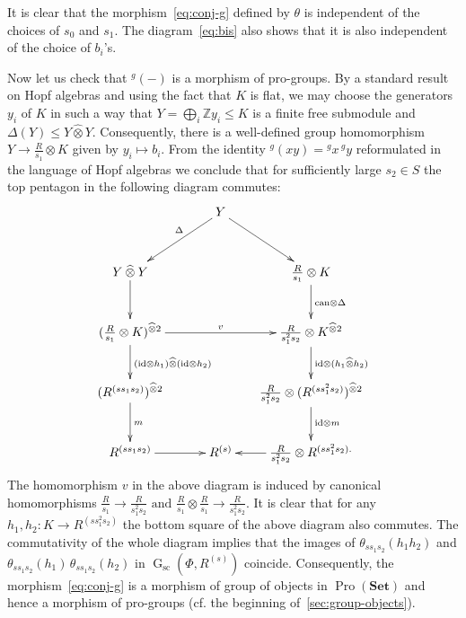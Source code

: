 \documentclass[oneside, 11pt]{amsart}
\numberwithin{equation}{section}
\theoremstyle{definition}
\theoremstyle{remark}
\DeclareMathOperator\GG{G}
\DeclareMathOperator{\Pro}{Pro}
\newcommand{\Set}{\mathbf{Set}}
\newcommand{\otimeshat}{\mathbin{\widehat{\otimes}}}
\newcommand{\up}[2]{{^{#1}\!{#2}}}
\begin{document}
It is clear that the morphism~\eqref{eq:conj-g} defined by $\theta$ is independent of the choices of $s_0$ and $s_1$. The diagram~\eqref{eq:bis} also shows that it is also independent of the choice of $b_i$'s.

Now let us check that \(\up g{(-)}\) is a morphism of pro-groups.
By a standard result on Hopf algebras and using the fact that $K$ is flat, we may choose the generators $y_i$ of \(K\) in such a way that $Y = \bigoplus_i \mathbb Z y_i \leq K$ is a finite free submodule and $\Delta(Y) \leq Y \otimeshat Y$. Consequently, there is a well-defined group homomorphism $Y \to \frac R{s_1} \otimes K$ given by $y_i \mapsto b_i$. From the identity $\up g{(xy)} = \up gx\, \up gy$ reformulated in the language of Hopf algebras we conclude that for sufficiently large $s_2 \in S$ the top pentagon in the following diagram commutes:
\begin{equation}\label{eq:house} \begin{aligned} \xymatrix@R=48pt@C=72pt@!0{
 & Y \ar[dr] \ar[dl]_(0.4){\Delta} & \\
Y \otimeshat Y \ar[d] &  & \frac R{s_1} \otimes K \ar[d]^{\mathrm{can} \otimes \Delta} \\
(\frac R{s_1} \otimes K)^{\otimeshat 2} \ar[rr]^{v} \ar[d]^{(\mathrm{id} \otimes h_1) \otimeshat (\mathrm{id} \otimes h_2)} && \frac R{s_1^2 s_2} \otimes K^{\otimeshat 2} \ar[d]^{\mathrm{id} \otimes (h_1 \otimeshat h_2)} \\
(R^{(ss_1s_2)})^{\otimeshat 2} \ar[d]^{m} && \frac R{s_1^2 s_2} \otimes (R^{(ss_1^2 s_2)})^{\otimeshat 2} \ar[d]^{\mathrm{id}\otimes m} \\
R^{(ss_1s_2)} \ar[r] & R^{(s)} & \frac R{s_1^2 s_2} \otimes R^{(ss_1^2 s_2).} \ar[l]
}\end{aligned}\end{equation}
The homomorphism $v$ in the above diagram is induced by canonical homomorphisms $\tfrac R {s_1} \to \tfrac R {s_1^2s_2}\text{ and }\tfrac{R} {s_1} \otimes \tfrac R{s_1} \to \tfrac R{s_1^2s_2}.$
It is clear that for any $h_1, h_2 \colon K \to R^{(ss_1^2 s_2)}$ the bottom square of the above diagram also commutes.
The commutativity of the whole diagram implies that the images of $\theta_{ss_1s_2}(h_1h_2)$ and $\theta_{ss_1s_2}(h_1)\, \theta_{ss_1s_2}(h_2)$ in $\GG_\mathrm{sc}(\Phi, R^{(s)})$ coincide. Consequently, the morphism~\eqref{eq:conj-g} is a morphism of group of objects in $\Pro(\Set)$ and hence a morphism of pro-groups (cf. the beginning of~\cref{sec:group-objects}).
\end{document}
